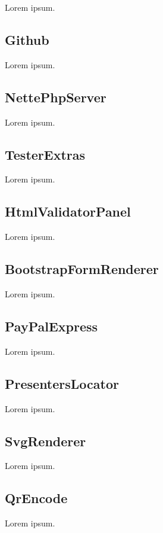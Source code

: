 Lorem ipsum.

\tocless\subsection{Github} \label{sec:state:github}

Lorem ipsum.

\tocless\subsection{NettePhpServer} \label{sec:state:nette-php-server}

Lorem ipsum.

\tocless\subsection{TesterExtras} \label{sec:state:tester-extras}

Lorem ipsum.

\tocless\subsection{HtmlValidatorPanel} \label{sec:state:html-validator-panel}

Lorem ipsum.

\tocless\subsection{BootstrapFormRenderer} \label{sec:state:bootstrap-form-renderer}

Lorem ipsum.

\tocless\subsection{PayPalExpress} \label{sec:state:paypal-express}

Lorem ipsum.

\tocless\subsection{PresentersLocator} \label{sec:state:presenters-locator}

Lorem ipsum.

\tocless\subsection{SvgRenderer} \label{sec:state:svg-renderer}

Lorem ipsum.

\tocless\subsection{QrEncode} \label{sec:state:qr-encode}

Lorem ipsum.